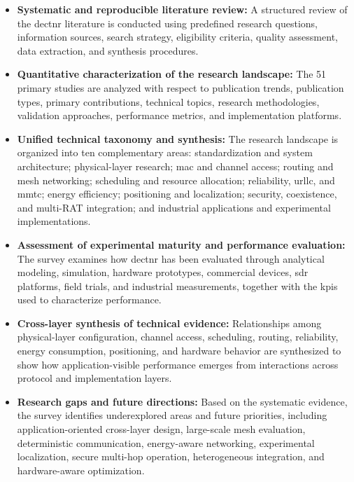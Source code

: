 \begin{itemize}

    \item \textbf{Systematic and reproducible literature review:}
    A structured review of the \gls{dectnr} literature is conducted using
    predefined research questions, information sources, search strategy,
    eligibility criteria, quality assessment, data extraction, and synthesis
    procedures.

    \item \textbf{Quantitative characterization of the research landscape:}
    The 51 primary studies are analyzed with respect to publication trends,
    publication types, primary contributions, technical topics, research
    methodologies, validation approaches, performance metrics, and
    implementation platforms.

    \item \textbf{Unified technical taxonomy and synthesis:}
    The research landscape is organized into ten complementary areas:
    standardization and system architecture; physical-layer research;
    \gls{mac} and channel access; routing and mesh networking; scheduling and
    resource allocation; reliability, \gls{urllc}, and \gls{mmtc}; energy
    efficiency; positioning and localization; security, coexistence, and
    multi-RAT integration; and industrial applications and experimental
    implementations.

    \item \textbf{Assessment of experimental maturity and performance
    evaluation:}
    The survey examines how \gls{dectnr} has been evaluated through analytical
    modeling, simulation, hardware prototypes, commercial devices,
    \gls{sdr} platforms, field trials, and industrial measurements, together
    with the \glspl{kpi} used to characterize performance.

    \item \textbf{Cross-layer synthesis of technical evidence:}
    Relationships among physical-layer configuration, channel access,
    scheduling, routing, reliability, energy consumption, positioning, and
    hardware behavior are synthesized to show how application-visible
    performance emerges from interactions across protocol and implementation
    layers.

    \item \textbf{Research gaps and future directions:}
    Based on the systematic evidence, the survey identifies underexplored
    areas and future priorities, including application-oriented cross-layer
    design, large-scale mesh evaluation, deterministic communication,
    energy-aware networking, experimental localization, secure multi-hop
    operation, heterogeneous integration, and hardware-aware optimization.

\end{itemize}

